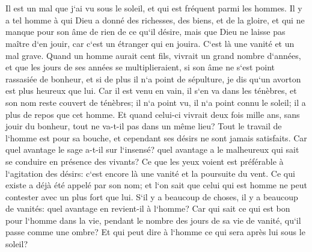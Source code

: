 \chapter{}

\verse Il est un mal que j`ai vu sous le soleil, et qui est fréquent parmi les hommes. 
\verse Il y a tel homme à qui Dieu a donné des richesses, des biens, et de la gloire, et qui ne manque pour son âme de rien de ce qu`il désire, mais que Dieu ne laisse pas maître d`en jouir, car c`est un étranger qui en jouira. C`est là une vanité et un mal grave. 
\verse Quand un homme aurait cent fils, vivrait un grand nombre d`années, et que les jours de ses années se multiplieraient, si son âme ne s`est point rassasiée de bonheur, et si de plus il n`a point de sépulture, je dis qu`un avorton est plus heureux que lui. 
\verse Car il est venu en vain, il s`en va dans les ténèbres, et son nom reste couvert de ténèbres; 
\verse il n`a point vu, il n`a point connu le soleil; il a plus de repos que cet homme. 
\verse Et quand celui-ci vivrait deux fois mille ans, sans jouir du bonheur, tout ne va-t-il pas dans un même lieu? 
\verse Tout le travail de l`homme est pour sa bouche, et cependant ses désirs ne sont jamais satisfaits. 
\verse Car quel avantage le sage a-t-il sur l`insensé? quel avantage a le malheureux qui sait se conduire en présence des vivants? 
\verse Ce que les yeux voient est préférable à l`agitation des désirs: c`est encore là une vanité et la poursuite du vent. 
\verse Ce qui existe a déjà été appelé par son nom; et l`on sait que celui qui est homme ne peut contester avec un plus fort que lui. 
\verse S`il y a beaucoup de choses, il y a beaucoup de vanités: quel avantage en revient-il à l`homme? 
\verse Car qui sait ce qui est bon pour l`homme dans la vie, pendant le nombre des jours de sa vie de vanité, qu`il passe comme une ombre? Et qui peut dire à l`homme ce qui sera après lui sous le soleil? 

\chapter{}

